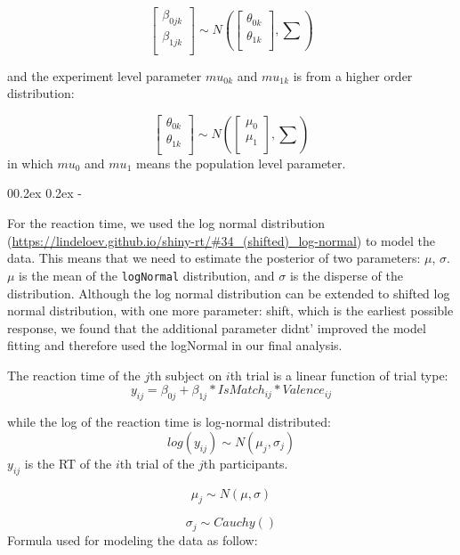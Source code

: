 \documentclass[
  english,
  man]{apa6}
\makeatletter
\let\oldsubparagraph\subparagraph
\renewcommand{\subparagraph}[1]{\oldsubparagraph{#1}\mbox{}}
\renewcommand{\subparagraph}[1]{\@startsection{subparagraph}{5}{1em}%
  {0\baselineskip \@plus 0.2ex \@minus 0.2ex}%
  {-\z@\relax}%
  {\normalfont\normalsize\itshape\hspace{\parindent}{#1}\textit{\addperi}}{\relax}}
\makeatother
\begin{document}
\[\begin{bmatrix}\beta_{0jk}\\
\beta_{1jk}\\
\end{bmatrix} \sim N(\begin{bmatrix}\theta_{0k}\\
\theta_{1k}\\
\end{bmatrix}, \sum)\]

and the experiment level parameter \(mu_{0k}\) and \(mu_{1k}\) is from a higher order distribution:

\[\begin{bmatrix}\theta_{0k}\\
\theta_{1k}\\
\end{bmatrix} \sim N(\begin{bmatrix}\mu_{0}\\
\mu_{1}\\
\end{bmatrix}, \sum)\]
in which \(mu_{0}\) and \(mu_{1}\) means the population level parameter.

\hypertarget{reaction-times}{%
\subparagraph{Reaction times}\label{reaction-times}}

For the reaction time, we used the log normal distribution (\url{https://lindeloev.github.io/shiny-rt/\#34_(shifted)_log-normal}) to model the data. This means that we need to estimate the posterior of two parameters: \(\mu\), \(\sigma\). \(\mu\) is the mean of the \texttt{logNormal} distribution, and \(\sigma\) is the disperse of the distribution. Although the log normal distribution can be extended to shifted log normal distribution, with one more parameter: shift, which is the earliest possible response, we found that the additional parameter didnt' improved the model fitting and therefore used the logNormal in our final analysis.

The reaction time of the \(j\)th subject on \(i\)th trial is a linear function of trial type: \[y_{ij} = \beta_{0j} + \beta_{1j}*IsMatch_{ij} * Valence_{ij}\]

while the log of the reaction time is log-normal distributed:
\[ log(y_{ij}) \sim N(\mu_{j}, \sigma_{j})\]
\(y_{ij}\) is the RT of the \(i\)th trial of the \(j\)th participants.

\[\mu_{j} \sim N(\mu, \sigma)\]

\[\sigma_{j} \sim Cauchy()\]
Formula used for modeling the data as follow:
\end{document}
